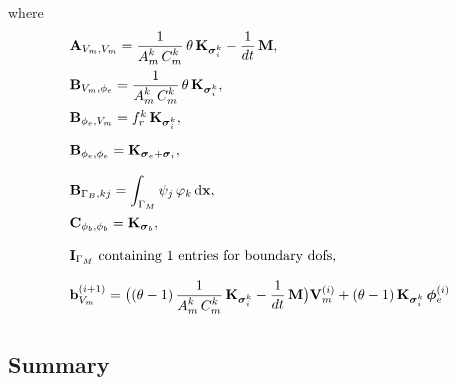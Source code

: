 where
\begin{equation*}
  \begin{array}{lll}
    \bfA_{V_m,V_m} = \dfrac{1}{A_m^k\,C_m^k}\theta\,\bfK_{\bfsigma_i^k} -\dfrac{1}{dt}\bfM,\\[4mm]
    \bfB_{V_m,\phi_e} = \dfrac{1}{A_m^k\,C_m^k}\theta\,\bfK_{\bfsigma_i^k},\\[4mm]
    \bfB_{\phi_e,V_m} = f_r^k \,\bfK_{\bfsigma_i^k},\\[4mm]
    \bfB_{\phi_e,\phi_e} = \bfK_{\bfsigma_e + \bfsigma_i},\\[4mm]
    \bfB_{\Gamma_B,kj} = \ds\int_{\Gamma_M} \psi_j\,\varphi_k \,\d\bfx,\\[4mm]
    \bfC_{\phi_b,\phi_b} = \bfK_{\bfsigma_b},\\[4mm]
    \bfI_{\Gamma_M} \text{ containing 1 entries for boundary dofs},\\[4mm]
    \bfb_{V_m}^{(i+1)} = \big((\theta-1)\, \dfrac{1}{A_m^k\,C_m^k}\bfK_{\bfsigma_i^k} - \dfrac{1}{dt}\bfM\big) \bfV_m^{(i)} 
      + (\theta - 1)\,\bfK_{\bfsigma_i^k}\,\bfphi_e^{(i)}\\[4mm]
  \end{array}
\end{equation*}



\subsection{Summary}

\newpage
\nocite{*}
{}


%


